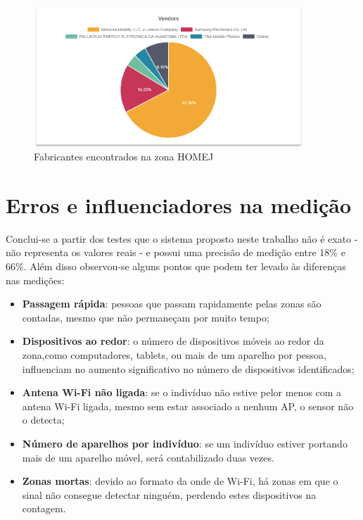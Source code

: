 \begin{figure}[!h]
  \caption{\label{graf2}Fabricantes encontrados na zona HOMEJ}
  \begin{center}
    \includegraphics[width=0.90\textwidth]{img/setor.png}
  \end{center}
\end{figure}

\section{Erros e influenciadores na medição}
\label{erros-influencia}
Conclui-se a partir dos testes que o sistema proposto neste trabalho não é exato - não
representa os valores reais - e possui uma precisão de medição entre 18\% e
66\%. Além disso observou-se alguns pontos que podem ter levado às diferenças nas medições:
\begin{itemize}
    \item \textbf{Passagem rápida}: pessoas que passam rapidamente pelas zonas são contadas, mesmo que não
    permaneçam por muito tempo;
    \item \textbf{Dispositivos ao redor}: o número de dispositivos móveis ao redor da zona,como computadores, tablets,
    ou mais de um aparelho por pessoa, influenciam no aumento significativo no número de dispositivos identificados;
    \item \textbf{Antena Wi-Fi não ligada}: se o indivíduo não estive pelor menos com a antena Wi-Fi ligada, mesmo sem
    estar associado a nenhum AP, o sensor não o detecta;
    \item \textbf{Número de aparelhos por indivíduo}: se um indivíduo estiver portando mais de um aparelho
    móvel, será contabilizado duas vezes.
    \item \textbf{Zonas mortas}: devido ao formato da onde de Wi-Fi, há zonas em que o sinal não consegue
    detectar ninguém, perdendo estes dispositivos na contagem.
\end{itemize}

